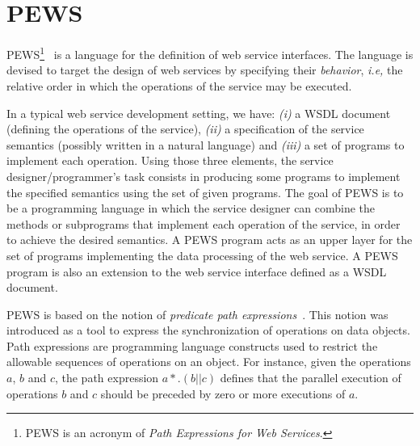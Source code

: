 \documentclass{sig-alternate}
\begin{document}



\section{PEWS} \label{sec:pews}
 

PEWS\footnote{PEWS is an acronym of \textit{Path Expressions for Web
Services}.}~\cite{BaCAM05,BaAM06,MPC08} is a language for the
definition of web service interfaces. The language is devised to target the design of web services by specifying their \textit{behavior}, \textit{i.e,} the
relative order in which the operations of the service may be executed.

In a typical web service development setting, we have: \textit{(i)}\/ a WSDL document (defining the
operations of the service), \textit{(ii)}\/ a specification of the service semantics (possibly written in a natural
language) and \textit{(iii)}\/ a set of programs to implement each operation. 
Using those three elements, the service designer/programmer's task consists in producing some programs to implement the
specified semantics using the set of given programs.
The goal of PEWS is to be a programming language in which the service designer can combine the methods or subprograms that implement each operation of the service, in order to achieve the desired semantics.
A PEWS program acts as an upper layer for the set of programs implementing the data processing of the web service.
A PEWS program is also an extension to the web service interface defined as a WSDL document.
 
PEWS is based on the notion of \textit{predicate path expressions}~\cite{And79}.
This notion was introduced as a tool to express the synchronization of operations on data objects. 
Path expressions are programming language constructs used to restrict the 
allowable sequences of operations on an object. 
For instance, given the operations $a$, $b$ and $c$, the path expression 
$a*.(b || c)$ defines that the parallel execution of operations $b$ and $c$ 
should be preceded by zero or more executions of $a$. 
\end{document}
